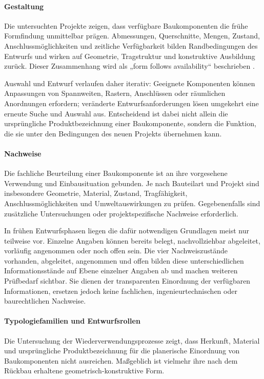 \documentclass[type=zwischenbericht]{zukunftbau}
\begin{document}
\begin{SemioNest}
\begin{SemioNest}
\paragraph{Gestaltung}
Die untersuchten Projekte zeigen, dass verfügbare Baukomponenten die frühe Formfindung unmittelbar prägen. Abmessungen, Querschnitte, Mengen, Zustand, Anschlussmöglichkeiten und zeitliche Verfügbarkeit bilden Randbedingungen des Entwurfs und wirken auf Geometrie, Tragstruktur und konstruktive Ausbildung zurück. Dieser Zusammenhang wird als „form follows availability“ beschrieben \cite{bruetting-senatore-fivet-form-follows-availability-2019}.

Auswahl und Entwurf verlaufen daher iterativ: Geeignete Komponenten können Anpassungen von Spannweiten, Rastern, Anschlüssen oder räumlichen Anordnungen erfordern; veränderte Entwurfsanforderungen lösen umgekehrt eine erneute Suche und Auswahl aus. Entscheidend ist dabei nicht allein die ursprüngliche Produktbezeichnung einer Baukomponente, sondern die Funktion, die sie unter den Bedingungen des neuen Projekts übernehmen kann.

\paragraph{Nachweise}
Die fachliche Beurteilung einer Baukomponente ist an ihre vorgesehene Verwendung und Einbausituation gebunden. Je nach Bauteilart und Projekt sind insbesondere Geometrie, Material, Zustand, Tragfähigkeit, Anschlussmöglichkeiten und Umweltauswirkungen zu prüfen. Gegebenenfalls sind zusätzliche Untersuchungen oder projektspezifische Nachweise erforderlich.

In frühen Entwurfsphasen liegen die dafür notwendigen Grundlagen meist nur teilweise vor. Einzelne Angaben können bereits belegt, nachvollziehbar abgeleitet, vorläufig angenommen oder noch offen sein. Die vier \Gls{Nachweiszustände} vorhanden, abgeleitet, angenommen und offen bilden diese unterschiedlichen Informationsstände auf Ebene einzelner Angaben ab und machen weiteren Prüfbedarf sichtbar. Sie dienen der transparenten Einordnung der verfügbaren Informationen, ersetzen jedoch keine fachlichen, ingenieurtechnischen oder baurechtlichen Nachweise.
\end{SemioNest}

\paragraph{Typologiefamilien und Entwurfsrollen}
Die Untersuchung der Wiederverwendungsprozesse zeigt, dass Herkunft, Material und ursprüngliche Produktbezeichnung für die planerische Einordnung von Baukomponenten nicht ausreichen. Maßgeblich ist vielmehr ihre nach dem Rückbau erhaltene geometrisch-konstruktive Form.


\end{SemioNest}
\end{document}
